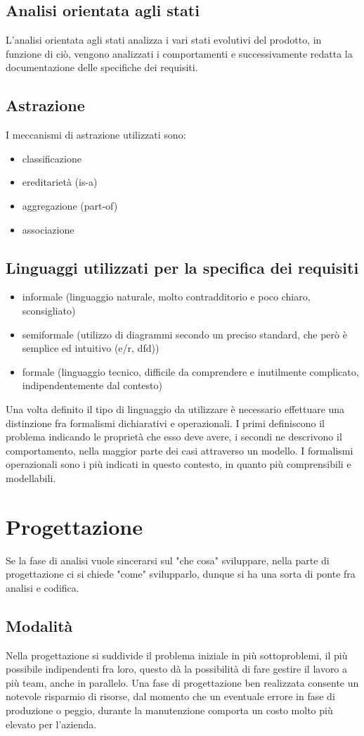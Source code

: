 \documentclass[a4paper,12pt]{report}
\begin{document}
	\section{Analisi orientata agli stati}
	L'analisi orientata agli stati analizza i vari stati evolutivi del prodotto, in funzione di ciò, vengono analizzati i comportamenti e successivamente redatta la documentazione delle specifiche dei requisiti.
	\section{Astrazione}
	I meccanismi di astrazione utilizzati sono:
	\begin{itemize}
		\item classificazione
		\item ereditarietà (is-a)
		\item aggregazione (part-of)
		\item associazione
	\end{itemize}
	\section{Linguaggi utilizzati per la specifica dei requisiti}
	\begin{itemize}
		\item informale (linguaggio naturale, molto contradditorio e poco chiaro, sconsigliato)
		\item semiformale (utilizzo di diagrammi secondo un preciso standard, che però è semplice ed intuitivo (e/r, dfd))
		\item formale (linguaggio tecnico, difficile da comprendere e inutilmente complicato, indipendentemente dal contesto)
	\end{itemize}
	Una volta definito il tipo di linguaggio da utilizzare è necessario effettuare una distinzione fra formalismi dichiarativi e operazionali. I primi definiscono il problema indicando le proprietà che esso deve avere, i secondi ne descrivono il comportamento, nella maggior parte dei casi attraverso un modello. I formalismi operazionali sono i più indicati in questo contesto, in quanto più comprensibili e modellabili.
	\newpage
	\chapter{Progettazione}
	Se la fase di analisi vuole sincerarsi sul "che cosa" sviluppare, nella parte di progettazione ci si chiede "come" svilupparlo, dunque si ha una sorta di ponte fra analisi e codifica.
	\section{Modalità}
	Nella progettazione si suddivide il problema iniziale in più sottoproblemi, il più possibile indipendenti fra loro, questo dà la possibilità di fare gestire il lavoro a più team, anche in parallelo. Una fase di progettazione ben realizzata consente un notevole risparmio di risorse, dal momento che un eventuale errore in fase di produzione o peggio, durante la manutenzione comporta un costo molto più elevato per l'azienda.
\end{document}
